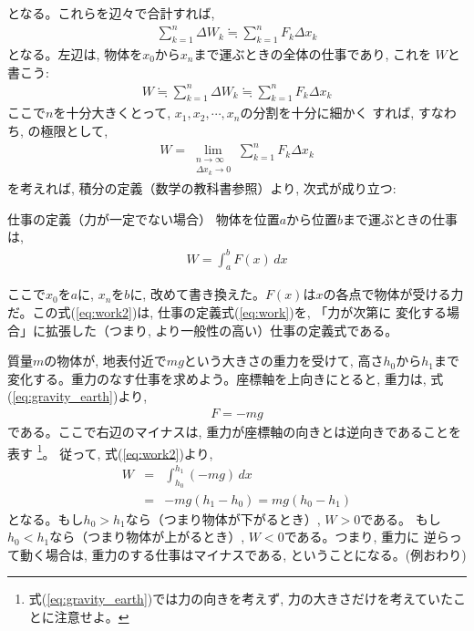 となる。これらを辺々で合計すれば, 
\begin{eqnarray}\sum_{k=1}^{n}\Delta W_k\fallingdotseq \sum_{k=1}^{n}F_k\Delta x_k\end{eqnarray}
となる。左辺は, 物体を$x_0$から$x_n$まで運ぶときの全体の仕事であり, これを
$W$と書こう:
\begin{eqnarray}
W\fallingdotseq \sum_{k=1}^{n}\Delta W_k\fallingdotseq\sum_{k=1}^{n}F_k\Delta x_k \label{eq:one_step_before_work2}
\end{eqnarray}
ここで$n$を十分大きくとって, $x_1, x_2, \cdots, x_n$の分割を十分に細かく
すれば, すなわち, の極限として, 
\begin{eqnarray}
W=\lim_{\substack{n\rightarrow \infty\\\Delta x_k\rightarrow 0}}\sum_{k=1}^{n}F_k\Delta x_k
\end{eqnarray}
を考えれば, 積分の定義（数学の教科書参照）より, 次式が成り立つ:
\begin{itembox}{仕事の定義（力が一定でない場合）}
物体を位置$a$から位置$b$まで運ぶときの仕事は, 
\begin{eqnarray}
W=\int_{a}^{b} F(x)\,dx \label{eq:work2}
\end{eqnarray}
\end{itembox}
ここで$x_0$を$a$に, $x_n$を$b$に, 改めて書き換えた。$F(x)$は$x$の各点で物体が受ける力
だ。この式(\ref{eq:work2})は, 仕事の定義式(\ref{eq:work})を, 「力が次第に
変化する場合」に拡張した（つまり, より一般性の高い）仕事の定義式である。\mv

\begin{exmpl}\label{ex:work_fall}
 質量$m$の物体が, 地表付近で$mg$という大きさの重力を受けて, 高さ$h_0$から$h_1$まで
変化する。重力のなす仕事を求めよう。座標軸を上向きにとると, 重力は, 式(\ref{eq:gravity_earth})より, 
\begin{eqnarray}F=-mg\end{eqnarray}
である。ここで右辺のマイナスは, 重力が座標軸の向きとは逆向きであることを表す
\footnote{式(\ref{eq:gravity_earth})では力の向きを考えず, 力の大きさだけを考えていたことに注意せよ。}。
従って, 式(\ref{eq:work2})より, 
\begin{eqnarray}
W&=&\int_{h_0}^{h_1} (-mg)\,dx\nonumber\\
 &=&-mg(h_1-h_0)=mg(h_0-h_1)\label{eq:grav_work_mgh}
\end{eqnarray}
となる。もし$h_0>h_1$なら（つまり物体が下がるとき）, $W>0$である。
もし$h_0<h_1$なら（つまり物体が上がるとき）, $W<0$である。つまり, 重力に
逆らって動く場合は, 重力のする仕事はマイナスである, ということになる。(例おわり)
\end{exmpl}

